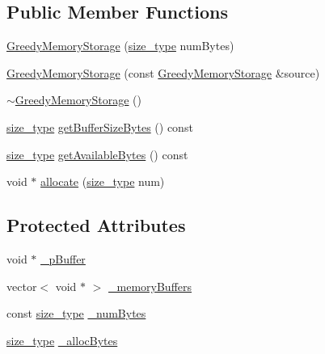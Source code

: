 \subsection*{Public Member Functions}
\begin{DoxyCompactItemize}
\item 
\hyperlink{classuva_1_1smt_1_1tries_1_1alloc_1_1_greedy_memory_storage_adf64473bd3554e6a99ee76eaa8f5bb86}{Greedy\+Memory\+Storage} (\hyperlink{classuva_1_1smt_1_1tries_1_1alloc_1_1_greedy_memory_storage_a15b9139bffa854a165a11131725fa903}{size\+\_\+type} num\+Bytes)
\item 
\hyperlink{classuva_1_1smt_1_1tries_1_1alloc_1_1_greedy_memory_storage_a9f6bc53f9409b7e33cbd71b049e84b62}{Greedy\+Memory\+Storage} (const \hyperlink{classuva_1_1smt_1_1tries_1_1alloc_1_1_greedy_memory_storage}{Greedy\+Memory\+Storage} \&source)
\item 
\hyperlink{classuva_1_1smt_1_1tries_1_1alloc_1_1_greedy_memory_storage_a1989fe7f8ce7a1d5a6eb5099a7f758a3}{$\sim$\+Greedy\+Memory\+Storage} ()
\item 
\hyperlink{classuva_1_1smt_1_1tries_1_1alloc_1_1_greedy_memory_storage_a15b9139bffa854a165a11131725fa903}{size\+\_\+type} \hyperlink{classuva_1_1smt_1_1tries_1_1alloc_1_1_greedy_memory_storage_a15e65cfaa69595d51abf6d0218a0b61e}{get\+Buffer\+Size\+Bytes} () const 
\item 
\hyperlink{classuva_1_1smt_1_1tries_1_1alloc_1_1_greedy_memory_storage_a15b9139bffa854a165a11131725fa903}{size\+\_\+type} \hyperlink{classuva_1_1smt_1_1tries_1_1alloc_1_1_greedy_memory_storage_a4f9ace52a4b63a18d93860adf2d227bb}{get\+Available\+Bytes} () const 
\item 
void $\ast$ \hyperlink{classuva_1_1smt_1_1tries_1_1alloc_1_1_greedy_memory_storage_a796730fda3574ac4654bed1e12b1117d}{allocate} (\hyperlink{classuva_1_1smt_1_1tries_1_1alloc_1_1_greedy_memory_storage_a15b9139bffa854a165a11131725fa903}{size\+\_\+type} num)
\end{DoxyCompactItemize}
\subsection*{Protected Attributes}
\begin{DoxyCompactItemize}
\item 
void $\ast$ \hyperlink{classuva_1_1smt_1_1tries_1_1alloc_1_1_greedy_memory_storage_a1c8ad9025dcdf7c396b72cb06a67662a}{\+\_\+p\+Buffer}
\item 
vector$<$ void $\ast$ $>$ \hyperlink{classuva_1_1smt_1_1tries_1_1alloc_1_1_greedy_memory_storage_a98f1adcd062b5d194b7a4a6053abf539}{\+\_\+memory\+Buffers}
\item 
const \hyperlink{classuva_1_1smt_1_1tries_1_1alloc_1_1_greedy_memory_storage_a15b9139bffa854a165a11131725fa903}{size\+\_\+type} \hyperlink{classuva_1_1smt_1_1tries_1_1alloc_1_1_greedy_memory_storage_ac9ba82a66f68d38f829fdca14cde1dee}{\+\_\+num\+Bytes}
\item 
\hyperlink{classuva_1_1smt_1_1tries_1_1alloc_1_1_greedy_memory_storage_a15b9139bffa854a165a11131725fa903}{size\+\_\+type} \hyperlink{classuva_1_1smt_1_1tries_1_1alloc_1_1_greedy_memory_storage_a7364ad54922d2866d881cada8d29017f}{\+\_\+alloc\+Bytes}
\end{DoxyCompactItemize}


